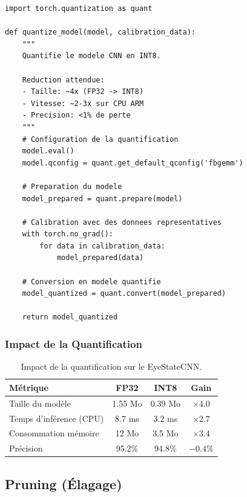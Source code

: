 \begin{lstlisting}[style=pythonstyle, caption={Quantification du modèle avec PyTorch.}, label={lst:quantization}]
import torch.quantization as quant

def quantize_model(model, calibration_data):
    """
    Quantifie le modele CNN en INT8.
    
    Reduction attendue:
    - Taille: ~4x (FP32 -> INT8)
    - Vitesse: ~2-3x sur CPU ARM
    - Precision: <1% de perte
    """
    # Configuration de la quantification
    model.eval()
    model.qconfig = quant.get_default_qconfig('fbgemm')
    
    # Preparation du modele
    model_prepared = quant.prepare(model)
    
    # Calibration avec des donnees representatives
    with torch.no_grad():
        for data in calibration_data:
            model_prepared(data)
    
    # Conversion en modele quantifie
    model_quantized = quant.convert(model_prepared)
    
    return model_quantized
\end{lstlisting}

\subsubsection{Impact de la Quantification}

\begin{table}[H]
\centering
\caption{Impact de la quantification sur le EyeStateCNN.}
\label{tab:quantization_impact}
\renewcommand{\arraystretch}{1.3}
\begin{tabular}{|l|c|c|c|}
\hline
\rowcolor{stellantisblue!15}
\textbf{Métrique} & \textbf{FP32} & \textbf{INT8} & \textbf{Gain} \\
\hline
Taille du modèle & 1.55 Mo & 0.39 Mo & $\times 4.0$ \\
\hline
Temps d'inférence (CPU) & 8.7 ms & 3.2 ms & $\times 2.7$ \\
\hline
Consommation mémoire & 12 Mo & 3.5 Mo & $\times 3.4$ \\
\hline
Précision & 95.2\% & 94.8\% & $-0.4\%$ \\
\hline
\end{tabular}
\end{table}

\subsection{Pruning (Élagage)}

